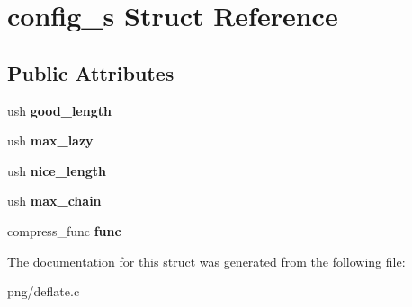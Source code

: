 \hypertarget{structconfig__s}{}\section{config\+\_\+s Struct Reference}
\label{structconfig__s}
\subsection*{Public Attributes}
\begin{DoxyCompactItemize}
\item 
ush {\bfseries good\+\_\+length}\hypertarget{structconfig__s_a36152319fbe49bebbc0354f8bcb617a6}{}\label{structconfig__s_a36152319fbe49bebbc0354f8bcb617a6}

\item 
ush {\bfseries max\+\_\+lazy}\hypertarget{structconfig__s_afecf50eeeb2afca11ab28d344280231b}{}\label{structconfig__s_afecf50eeeb2afca11ab28d344280231b}

\item 
ush {\bfseries nice\+\_\+length}\hypertarget{structconfig__s_af2a1e023e10d6e0c9ff64f8c0c4c9894}{}\label{structconfig__s_af2a1e023e10d6e0c9ff64f8c0c4c9894}

\item 
ush {\bfseries max\+\_\+chain}\hypertarget{structconfig__s_ac0ef64600cf4487e3754a21934ffdb89}{}\label{structconfig__s_ac0ef64600cf4487e3754a21934ffdb89}

\item 
compress\+\_\+func {\bfseries func}\hypertarget{structconfig__s_aea5a0fe31d694079966523a49d60174b}{}\label{structconfig__s_aea5a0fe31d694079966523a49d60174b}

\end{DoxyCompactItemize}


The documentation for this struct was generated from the following file\+:\begin{DoxyCompactItemize}
\item 
png/deflate.\+c\end{DoxyCompactItemize}
